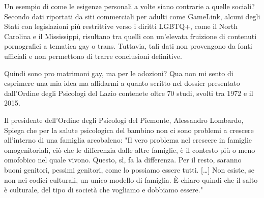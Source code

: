 \documentclass[12pt]{book} %
\begin{document}
\begin{mdframed}[linewidth=1pt]
Un esempio di come le esigenze personali a volte siano contrarie a quelle sociali? Secondo dati riportati da siti commerciali per adulti come GameLink, alcuni degli Stati con legislazioni più restrittive verso i diritti LGBTQ+, come il North Carolina e il Mississippi, risultano tra quelli con un’elevata fruizione di contenuti pornografici a tematica gay o trans. Tuttavia, tali dati non provengono da fonti ufficiali e non permettono di trarre conclusioni definitive.

Quindi sono pro matrimoni gay, ma per le adozioni? Qua non mi sento di esprimere una mia idea ma affidarmi a quanto
scritto nel
dossier presentato dall'Ordine degli Psicologi del Lazio contenete oltre 70 studi, svolti tra 1972 e il 2015. 

Il presidente dell'Ordine degli Psicologi del Piemonte, Alessandro Lombardo, Spiega che per la salute psicologica del
bambino non ci sono problemi a crescere all'interno di una famiglia arcobaleno: "Il
vero problema nel crescere in famiglie omogenitoriali, ciò che le differenzia dalle altre famiglie, è il contesto più o
meno omofobico nel quale vivono. Questo, sì, fa la differenza. Per il resto, saranno buoni genitori, pessimi genitori,
come lo possiamo essere tutti. […] Non esiste, se non nei codici culturali, un unico modello di famiglia. È chiaro
quindi che il salto è culturale, del tipo di società che vogliamo e dobbiamo
essere."
\end{mdframed}
\end{document}
